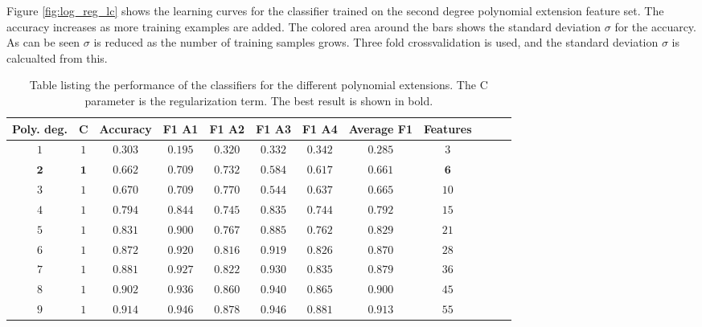             Figure \ref{fig:log_reg_lc} shows the learning curves for the classifier trained on the second degree polynomial extension feature set. The accuracy increases as more training examples are added. The colored area around the bars shows the standard deviation $\sigma$ for the accuarcy. As can be seen $\sigma$ is reduced as the number of training samples grows. Three fold crossvalidation is used, and the standard deviation $\sigma$ is calcualted from this.  
            
            
            \begin{table}[]
                \centering
                \begin{tabular}{|c|c|c|c|c|c|c|c|c|c|c|c|}
                    \hline
                    Poly. deg.  & C     & Accuracy  &F1 A1      &F1 A2      &F1 A3      &F1 A4      & Average F1    &  Features  \\ \hline
                     $1$        & $1$   & $0.303$    & $0.195$    & $0.320$    & $0.332$    & $0.342$    & $0.285$       & $3$\\ \hline
                     $\bm{2}$        & $\bm{1}$   & $\bm{0.662}$    & $\bm{0.709}$    & $\bm{0.732}$    & $\bm{0.584}$    & $\bm{0.617}$    & $\bm{0.661}$        & $\bm{6}$\\ \hline
                     $3$        & $1$   & $0.670$    & $0.709$    & $0.770$    & $0.544$    & $0.637$    & $0.665$        & $10$\\ \hline
                     $4$        & $1$   & $0.794$    & $0.844$    & $0.745$    & $0.835$    & $0.744$    & $0.792$        & $15$\\ \hline
                     $5$        & $1$   & $0.831$    & $0.900$    & $0.767$    & $0.885$    & $0.762$    & $0.829$        & $21$\\ \hline
                     $6$        & $1$   & $0.872$    & $0.920$    & $0.816$    & $0.919$    & $0.826$    & $0.870$        & $28$\\ \hline
                     $7$        & $1$   & $0.881$    & $0.927$    & $0.822$    & $0.930$    & $0.835$    & $0.879$        & $36$\\ \hline
                     $8$        & $1$   & $0.902$    & $0.936$    & $0.860$    & $0.940$    & $0.865$    & $0.900$        & $45$\\ \hline
                     $9$        & $1$   & $0.914$    & $0.946$    & $0.878$    & $0.946$    & $0.881$    & $0.913$        & $55$\\ \hline
                \end{tabular}
                \caption{Table listing the performance of the classifiers for the different polynomial extensions. The C parameter is the regularization term. The best result is shown in bold.}
                \label{tab:logr_reg}
            \end{table}
        
